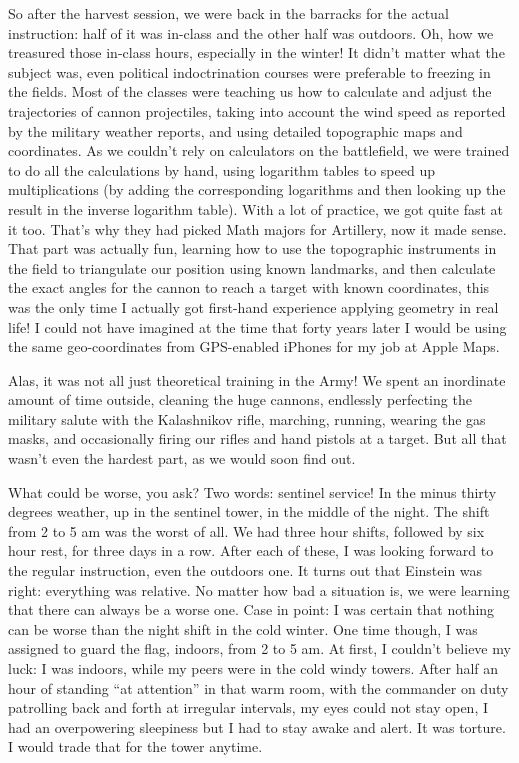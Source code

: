 \documentclass[12pt]{book}
\begin{document}
So after the harvest session, we were back in the barracks for the
actual instruction: half of it was in-class and the other half was
outdoors. Oh, how we treasured those in-class hours, especially in the
winter! It didn't matter what the subject was, even political
indoctrination courses were preferable to freezing in the fields. Most
of the classes were teaching us how to calculate and adjust the
trajectories of cannon projectiles, taking into account the wind speed
as reported by the military weather reports, and using detailed
topographic maps and coordinates. As we couldn't rely on calculators on
the battlefield, we were trained to do all the calculations by hand,
using logarithm tables to speed up multiplications (by adding the
corresponding logarithms and then looking up the result in the inverse
logarithm table). With a lot of practice, we got quite fast at it too.
That's why they had picked Math majors for Artillery, now it made sense.
That part was actually fun, learning how to use the topographic
instruments in the field to triangulate our position using known
landmarks, and then calculate the exact angles for the cannon to reach a
target with known coordinates, this was the only time I actually got
first-hand experience applying geometry in real life! I could not have
imagined at the time that forty years later I would be using the same
geo-coordinates from GPS-enabled iPhones for my job at Apple Maps.

Alas, it was not all just theoretical training in the Army! We spent an
inordinate amount of time outside, cleaning the huge cannons, endlessly
perfecting the military salute with the Kalashnikov rifle, marching,
running, wearing the gas masks, and occasionally firing our rifles and
hand pistols at a target. But all that wasn't even the hardest part, as
we would soon find out.

What could be worse, you ask? Two words: sentinel service! In the minus
thirty degrees weather, up in the sentinel tower, in the middle of the
night. The shift from 2 to 5 am was the worst of all. We had three hour
shifts, followed by six hour rest, for three days in a row. After each
of these, I was looking forward to the regular instruction, even the
outdoors one. It turns out that Einstein was right: everything was
relative. No matter how bad a situation is, we were learning that there
can always be a worse one. Case in point: I was certain that nothing can
be worse than the night shift in the cold winter. One time though, I was
assigned to guard the flag, indoors, from 2 to 5 am. At first, I
couldn't believe my luck: I was indoors, while my peers were in the cold
windy towers. After half an hour of standing ``at attention'' in that
warm room, with the commander on duty patrolling back and forth at
irregular intervals, my eyes could not stay open, I had an overpowering
sleepiness but I had to stay awake and alert. It was torture. I would
trade that for the tower anytime.
\end{document}

